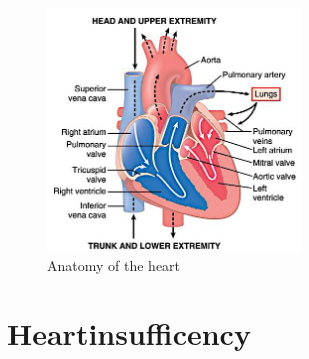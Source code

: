 \begin{figure}[h]
  \centering
  \includegraphics[width=0.6\textwidth]{images/heart_1.jpg}
  \caption{Anatomy of the heart \cite{GH20}}
  \label{fig:heart_anat}
\end{figure}
\section{Heartinsufficency}
